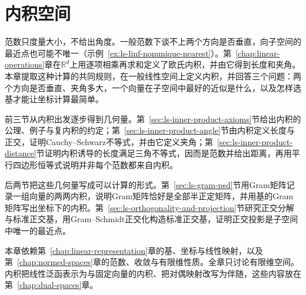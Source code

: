 \chapter{内积空间}
\label{chap:inner-product-spaces}

范数只度量大小，不给出角度。一般范数下谈不上两个方向是否垂直，向子空间的最近点也可能不唯一（示例~\ref{ex:ls-linf-nonunique-nearest}）。第~\ref{chap:linear-operations}章在$\mathbb R^d$上用逐项相乘再求和定义了欧氏内积，并由它得到长度和夹角。本章提取这种计算的共同规则，在一般线性空间上定义内积，并回答三个问题：两个方向是否垂直、夹角多大，一个向量在子空间中最好的近似是什么，以及怎样选基才能让坐标计算最简单。

前三节从内积出发逐步得到几何量。第~\ref{sec:ls-inner-product-axioms}节给出内积的公理、例子与复内积的约定；第~\ref{sec:ls-inner-product-angle}节由内积定义长度与正交，证明Cauchy--Schwarz不等式，并由它定义夹角；第~\ref{sec:ls-inner-product-distance}节证明内积诱导的长度满足三角不等式，因而是范数并给出距离，再用平行四边形恒等式说明并非每个范数都来自内积。

后两节把这些几何量写成可以计算的形式。第~\ref{sec:ls-gram-psd}节用Gram矩阵记录一组向量的两两内积，说明Gram矩阵恰好是全部半正定矩阵，并用基的Gram矩阵写出坐标下的内积。第~\ref{sec:ls-orthogonality-and-projection}节研究正交分解与标准正交基，用Gram--Schmidt正交化构造标准正交基，证明正交投影是子空间中唯一的最近点。

本章依赖第~\ref{chap:linear-representation}章的基、坐标与线性映射，以及第~\ref{chap:normed-spaces}章的范数、收敛与有限维性质。全章只讨论有限维空间。内积把线性泛函表示为与固定向量的内积、把对偶映射改写为伴随，这些内容放在第~\ref{chap:dual-spaces}章。







